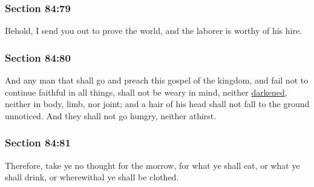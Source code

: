 	\subsubsection{Section 84:79} %
		\label{DC84-79}

		Behold, I send you out to prove the world, and the laborer is worthy of his hire.


	\subsubsection{Section 84:80} %
		\label{DC84-80}

		And any man that shall go and preach this gospel of the kingdom, and fail not to continue faithful in all things, shall not be weary in mind, neither \hyperref[DARKNESS-1828]{darkened}, neither in body, limb, nor joint; and a hair of his head shall not fall to the ground unnoticed.  And they shall not go hungry, neither athirst.


	\subsubsection{Section 84:81} %
		\label{DC84-81}

		Therefore, take ye no thought for the morrow, for what ye shall eat, or what ye shall drink, or wherewithal ye shall be clothed.


